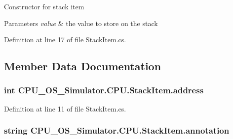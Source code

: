Constructor for stack item 


\begin{DoxyParams}{Parameters}
{\em value} & the value to store on the stack\\
\hline
\end{DoxyParams}


Definition at line 17 of file Stack\+Item.\+cs.



\subsection{Member Data Documentation}
\hypertarget{class_c_p_u___o_s___simulator_1_1_c_p_u_1_1_stack_item_aa3d343371c939e5279496e374ba7da1c}{}
\subsubsection[{address}]{\setlength{\rightskip}{0pt plus 5cm}int C\+P\+U\+\_\+\+O\+S\+\_\+\+Simulator.\+C\+P\+U.\+Stack\+Item.\+address\hspace{0.3cm}{\ttfamily [private]}}\label{class_c_p_u___o_s___simulator_1_1_c_p_u_1_1_stack_item_aa3d343371c939e5279496e374ba7da1c}


Definition at line 11 of file Stack\+Item.\+cs.

\hypertarget{class_c_p_u___o_s___simulator_1_1_c_p_u_1_1_stack_item_ae73bf2077598fcf2849a0fb1024b2d77}{}
\subsubsection[{annotation}]{\setlength{\rightskip}{0pt plus 5cm}string C\+P\+U\+\_\+\+O\+S\+\_\+\+Simulator.\+C\+P\+U.\+Stack\+Item.\+annotation\hspace{0.3cm}{\ttfamily [private]}}\label{class_c_p_u___o_s___simulator_1_1_c_p_u_1_1_stack_item_ae73bf2077598fcf2849a0fb1024b2d77}


